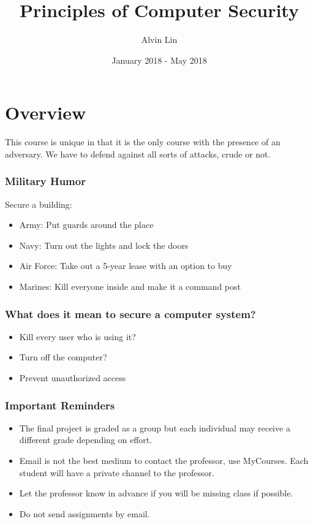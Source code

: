 \documentclass{math}
\title{Principles of Computer Security}
\author{Alvin Lin}
\date{January 2018 - May 2018}
\begin{document}
\maketitle

\section*{Overview}
This course is unique in that it is the only course with the presence of an
adversary. We have to defend against all sorts of attacks, crude or not.

\subsubsection*{Military Humor}
Secure a building:
\begin{itemize}
  \item Army: Put guards around the place
  \item Navy: Turn out the lights and lock the doors
  \item Air Force: Take out a 5-year lease with an option to buy
  \item Marines: Kill everyone inside and make it a command post
\end{itemize}

\subsubsection*{What does it mean to secure a computer system?}
\begin{itemize}
  \item Kill every user who is using it?
  \item Turn off the computer?
  \item Prevent unauthorized access
\end{itemize}

\subsubsection*{Important Reminders}
\begin{itemize}
  \item The final project is graded as a group but each individual may receive
  a different grade depending on effort.
  \item Email is not the best medium to contact the professor, use MyCourses.
  Each student will have a private channel to the professor.
  \item Let the professor know in advance if you will be missing class if
  possible.
  \item Do not send assignments by email.
\end{itemize}
\end{document}
